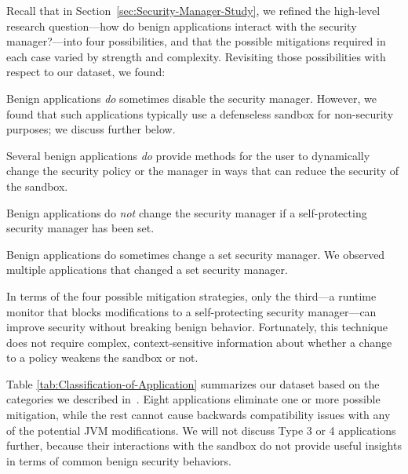 \documentclass{sig-alternate}
\begin{document}
Recall that in Section~\ref{sec:Security-Manager-Study}, we refined the
high-level research question---how do benign applications interact with the
security manager?---into four possibilities, and that the possible mitigations
required in each case varied by strength and complexity.  Revisiting those
possibilities with respect to our dataset, we found:
\begin{flushenum}\setlength{\parskip}{0pt}
  \setlength{\parsep}{0pt}
  \setlength{\itemsep}{0pt}
\item Benign applications \emph{do} sometimes disable the security manager.
  However, we found that such applications typically use a defenseless sandbox for
  non-security purposes; we discuss further below.

\item Several benign applications \emph{do} provide methods for the user to
  dynamically change the security policy or the manager in ways that can reduce
  the security of the sandbox.

\item Benign applications do \emph{not} change the
security manager if a self-protecting security manager has been set.  

\item Benign applications do sometimes change a set security manager.  We
  observed multiple applications that changed a set security manager.
\end{flushenum}

In terms of the four possible mitigation strategies,
only the third---a runtime monitor that blocks modifications to a self-protecting security manager---can
improve security without breaking benign behavior. 
Fortunately, this technique does not require complex, context-sensitive
information about whether a change to a policy weakens the sandbox or not. 

% 
Table \ref{tab:Classification-of-Application}
summarizes our dataset based on the categories we described
in~. Eight applications eliminate one or more possible
mitigation, while the rest cannot cause backwards compatibility issues with any
of the potential JVM modifications. We will
not discuss Type 3 or 4 applications further, because their interactions with
the sandbox do not provide useful insights in terms of common benign security
behaviors. 
\end{document}
